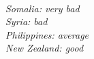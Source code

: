 \leavevmode \\
\begin{center}
    \begin{minipage}{0.6\textwidth}
        \textit{%
            Somalia: very bad \\
            Syria: bad \\
            Philippines: average \\
            New Zealand: good}%
    \end{minipage}
\end{center}
